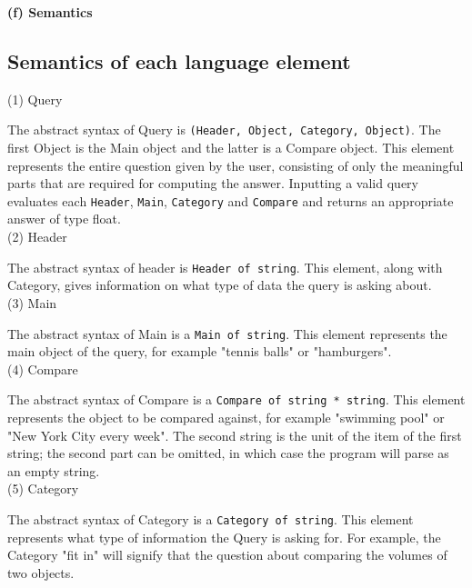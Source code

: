 \documentclass{article}
\begin{document}
\newpage
{\large{\textbf{(f) Semantics}}} 
\subsection{Semantics of each language element}

(1) Query 
\vspace{5pt}

The abstract syntax of Query is \texttt{(Header, Object, Category, Object)}. The first Object is the Main object and the latter is a Compare object. This element represents the entire question given by the user, consisting of only the meaningful parts that are required for computing the answer. Inputting a valid query evaluates each \texttt{Header}, \texttt{Main}, \texttt{Category} and \texttt{Compare} and returns an appropriate answer of type float. \\

(2) Header 
\vspace{5pt}

The abstract syntax of header is \texttt{Header of string}. This element, along with Category, gives information on what type of data the query is asking about. \\

(3) Main 
\vspace{5pt}

The abstract syntax of Main is a \texttt{Main of string}. This element represents the main object of the query, for example "tennis balls" or "hamburgers". \\

(4) Compare 
\vspace{5pt}

The abstract syntax of Compare is a \texttt{Compare of string * string}. This element represents the object to be compared against, for example "swimming pool" or "New York City every week". The second string is the unit of the item of the first string; the second part can be omitted, in which case the program will parse as an empty string. \\

(5) Category 
\vspace{5pt}

The abstract syntax of Category is a \texttt{Category of string}. This element represents what type of information the Query is asking for. For example, the Category "fit in" will signify that the question about comparing the volumes of two objects.  \\
\end{document}
